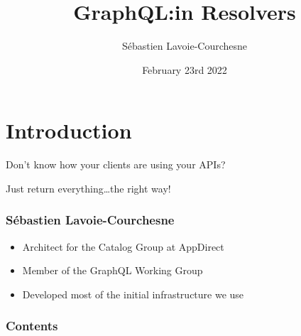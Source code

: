 \documentclass{beamer}
\title{GraphQL:\@Thinking in Resolvers}
\author{Sébastien Lavoie-Courchesne}
\date{February 23rd 2022}
\begin{document}
\section*{Introduction}
\addtocounter{section}{1}
\begin{frame}
  \titlepage{}
\end{frame}

\begin{frame}
  \begin{center}
    Don't know how your clients are using your APIs?

    \vspace{2em}
    Just return everything\ldots{}the right way!
  \end{center}
\end{frame}


\begin{frame}
  \frametitle{Sébastien Lavoie-Courchesne}
  \begin{itemize}
  \item Architect for the Catalog Group at AppDirect
  \item Member of the GraphQL Working Group
  \item Developed most of the initial infrastructure we use
  \end{itemize}
\end{frame}


\begin{frame}
  \frametitle{Contents}
  \tableofcontents
\end{frame}
\end{document}
